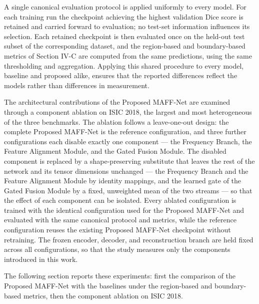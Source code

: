 A single canonical evaluation protocol is applied uniformly to every model. For each training run the checkpoint achieving the highest validation Dice score is retained and carried forward to evaluation; no test-set information influences its selection. Each retained checkpoint is then evaluated once on the held-out test subset of the corresponding dataset, and the region-based and boundary-based metrics of Section IV-C are computed from the same predictions, using the same thresholding and aggregation. Applying this shared procedure to every model, baseline and proposed alike, ensures that the reported differences reflect the models rather than differences in measurement.

The architectural contributions of the Proposed MAFF-Net are examined through a component ablation on ISIC 2018, the largest and most heterogeneous of the three benchmarks. The ablation follows a leave-one-out design: the complete Proposed MAFF-Net is the reference configuration, and three further configurations each disable exactly one component --- the Frequency Branch, the Feature Alignment Module, and the Gated Fusion Module. The disabled component is replaced by a shape-preserving substitute that leaves the rest of the network and its tensor dimensions unchanged --- the Frequency Branch and the Feature Alignment Module by identity mappings, and the learned gate of the Gated Fusion Module by a fixed, unweighted mean of the two streams --- so that the effect of each component can be isolated. Every ablated configuration is trained with the identical configuration used for the Proposed MAFF-Net and evaluated with the same canonical protocol and metrics, while the reference configuration reuses the existing Proposed MAFF-Net checkpoint without retraining. The frozen encoder, decoder, and reconstruction branch are held fixed across all configurations, so that the study measures only the components introduced in this work.

The following section reports these experiments: first the comparison of the Proposed MAFF-Net with the baselines under the region-based and boundary-based metrics, then the component ablation on ISIC 2018.

